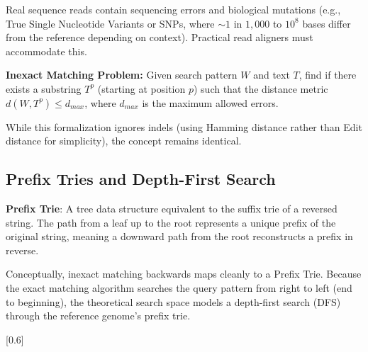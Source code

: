 Real sequence reads contain sequencing errors and biological mutations (e.g., True Single Nucleotide Variants or SNPs, where $\sim 1$ in $1,000$ to $10^8$ bases differ from the reference depending on context). Practical read aligners must accommodate this.

\begin{important}
    \textbf{Inexact Matching Problem:} Given search pattern $W$ and text $T$, find if there exists a substring $T^p$ (starting at position $p$) such that the distance metric $d(W, T^p) \leq d_{max}$, where $d_{max}$ is the maximum allowed errors.
\end{important}

While this formalization ignores indels (using Hamming distance rather than Edit distance for simplicity), the concept remains identical.

\subsection{Prefix Tries and Depth-First Search}

\begin{important}
    \textbf{Prefix Trie}: A tree data structure equivalent to the suffix trie of a reversed string. The path from a leaf up to the root represents a unique prefix of the original string, meaning a downward path from the root reconstructs a prefix in reverse.
\end{important}

Conceptually, inexact matching backwards maps cleanly to a Prefix Trie. Because the exact matching algorithm searches the query pattern from right to left (end to beginning), the theoretical search space models a depth-first search (DFS) through the reference genome's prefix trie.


[0.6]

